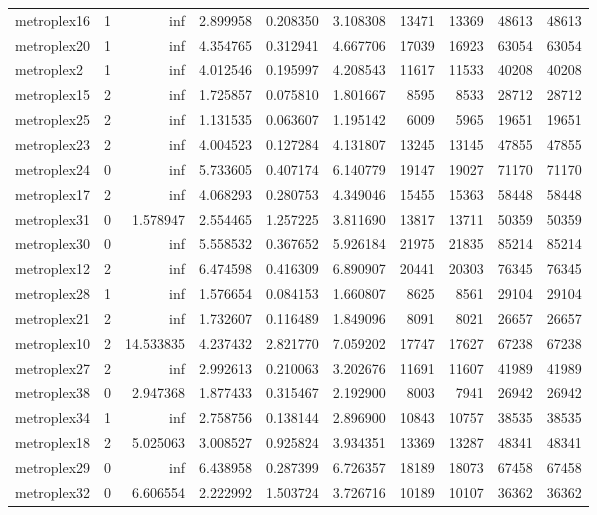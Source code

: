 \begin{longtable}{|l|r|r|r|r|r|r|r|r|r|}
metroplex16 & 1 & inf & 2.899958 & 0.208350 & 3.108308 & 13471 & 13369 & 48613 & 48613 \\
metroplex20 & 1 & inf & 4.354765 & 0.312941 & 4.667706 & 17039 & 16923 & 63054 & 63054 \\
metroplex2 & 1 & inf & 4.012546 & 0.195997 & 4.208543 & 11617 & 11533 & 40208 & 40208 \\
metroplex15 & 2 & inf & 1.725857 & 0.075810 & 1.801667 & 8595 & 8533 & 28712 & 28712 \\
metroplex25 & 2 & inf & 1.131535 & 0.063607 & 1.195142 & 6009 & 5965 & 19651 & 19651 \\
metroplex23 & 2 & inf & 4.004523 & 0.127284 & 4.131807 & 13245 & 13145 & 47855 & 47855 \\
metroplex24 & 0 & inf & 5.733605 & 0.407174 & 6.140779 & 19147 & 19027 & 71170 & 71170 \\
metroplex17 & 2 & inf & 4.068293 & 0.280753 & 4.349046 & 15455 & 15363 & 58448 & 58448 \\
metroplex31 & 0 & 1.578947 & 2.554465 & 1.257225 & 3.811690 & 13817 & 13711 & 50359 & 50359 \\
metroplex30 & 0 & inf & 5.558532 & 0.367652 & 5.926184 & 21975 & 21835 & 85214 & 85214 \\
metroplex12 & 2 & inf & 6.474598 & 0.416309 & 6.890907 & 20441 & 20303 & 76345 & 76345 \\
metroplex28 & 1 & inf & 1.576654 & 0.084153 & 1.660807 & 8625 & 8561 & 29104 & 29104 \\
metroplex21 & 2 & inf & 1.732607 & 0.116489 & 1.849096 & 8091 & 8021 & 26657 & 26657 \\
metroplex10 & 2 & 14.533835 & 4.237432 & 2.821770 & 7.059202 & 17747 & 17627 & 67238 & 67238 \\
metroplex27 & 2 & inf & 2.992613 & 0.210063 & 3.202676 & 11691 & 11607 & 41989 & 41989 \\
metroplex38 & 0 & 2.947368 & 1.877433 & 0.315467 & 2.192900 & 8003 & 7941 & 26942 & 26942 \\
metroplex34 & 1 & inf & 2.758756 & 0.138144 & 2.896900 & 10843 & 10757 & 38535 & 38535 \\
metroplex18 & 2 & 5.025063 & 3.008527 & 0.925824 & 3.934351 & 13369 & 13287 & 48341 & 48341 \\
metroplex29 & 0 & inf & 6.438958 & 0.287399 & 6.726357 & 18189 & 18073 & 67458 & 67458 \\
metroplex32 & 0 & 6.606554 & 2.222992 & 1.503724 & 3.726716 & 10189 & 10107 & 36362 & 36362 \\

\end{longtable}
